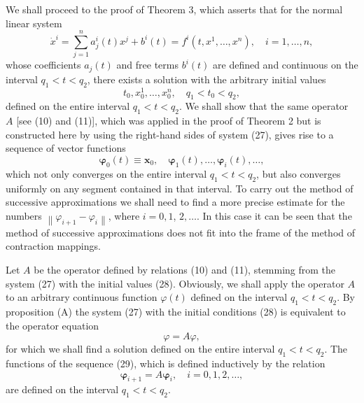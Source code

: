 \documentclass[10pt,a5paper]{book}
\makeatletter
\theoremstyle{plain}
\theoremstyle{definition}
\theoremstyle{remark}
\renewenvironment{proof}[1][\proofname]{\par
  \pushQED{\qed}%
  \normalfont\topsep6\p@\@plus6\p@\relax
  \trivlist
  \item\relax{\itshape #1\@addpunct{.}}\hspace\labelsep\ignorespaces
}{\popQED\endtrivlist\@endpefalse}
\makeatother
\begin{document}
\begin{proof}[Proof of Theorem 3]
We shall proceed to the proof of Theorem 3, which asserts that for the normal linear system
\begin{equation*}
\dot{x}^{i}=\sum_{j=1}^{n} a_{j}^{i}(t) x^{j}+b^{i}(t)=f^{i}\left(t, x^{1}, \ldots, x^{n}\right), \quad i=1, \ldots, n, \tag{27}
\end{equation*}
whose coefficients $a_{j}(t)$ and free terms $b^{i}(t)$ are defined and continuous on the interval $q_{1}<t<q_{2}$, there exists a solution with the arbitrary initial values
\begin{equation*}
t_{0}, x_{0}^{1}, \ldots, x_{0}^{n}, \quad q_{1}<t_{0}<q_{2}, \tag{28}
\end{equation*}
defined on the entire interval $q_{1}<t<q_{2}$. We shall show that the same operator $A$ [see (10) and (11)], which was applied in the proof of Theorem 2 but is constructed here by using the right-hand sides of system (27),
gives rise to a sequence of vector functions
\begin{equation*}
\boldsymbol{\varphi}_{0}(t) \equiv \mathbf{x}_{0}, \quad \boldsymbol{\varphi}_{1}(t), \ldots, \boldsymbol{\varphi}_{i}(t), \ldots, \tag{29}
\end{equation*}
which not only converges on the entire interval $q_{1}<t<q_{2}$, but also converges uniformly on any segment contained in that interval. To carry out the method of successive approximations we shall need to find a more precise estimate for the numbers $\left\|\varphi_{i+1}-\varphi_{i}\right\|$, where $i=0,1$, $2, \ldots$. In this case it can be seen that the method of successive approximations does not fit into the frame of the method of contraction mappings.

Let $A$ be the operator defined by relations (10) and (11), stemming from the system (27) with the initial values (28). Obviously, we shall apply the operator $A$ to an arbitrary continuous function $\varphi(t)$ defined on the interval $q_{1}<t<q_{2}$. By proposition (A) the system (27) with the initial conditions (28) is equivalent to the operator equation
\begin{equation*}
\varphi=A \varphi, \tag{30}
\end{equation*}
for which we shall find a solution defined on the entire interval $q_{1}<t<q_{2}$. The functions of the sequence (29), which is defined inductively by the relation
\begin{equation*}
\boldsymbol{\varphi}_{i+1}=A \boldsymbol{\varphi}_{i}, \quad i=0,1,2, \ldots, \tag{31}
\end{equation*}
are defined on the interval $q_{1}<t<q_{2}$.


\end{proof}
\end{document}
